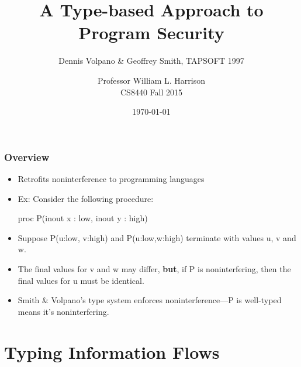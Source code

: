 \documentclass{beamer}
\title{A Type-based Approach to Program Security}
\subtitle{Dennis Volpano \& Geoffrey Smith, TAPSOFT 1997}
\author{Professor William L. Harrison\\CS8440 Fall 2015}
\date{\today}
\begin{document}
\frame{\titlepage}

\begin{frame}[fragile]
\frametitle{Overview}


\begin{itemize}
\item Retrofits noninterference to programming languages
\pause
\item Ex: Consider the following procedure: 
\begin{haskell}
proc P(inout x : low, inout y : high)
\end{haskell}
\pause
\item Suppose \<P(u:low, v:high)\> and \<P(u:low,w:high)\> terminate
      with values \<u\>, \<v\> and \<w\>.
\pause
\item The final values for \<v\> and \<w\> may differ, 
 {\bf but}, if \<P\> is noninterfering, then the final values for \<u\> must be identical.
\pause
\item Smith \& Volpano's type system enforces noninterference---\<P\> is well-typed means it's noninterfering.
\end{itemize}

\end{frame}

\section{Typing Information Flows}
\end{document}
